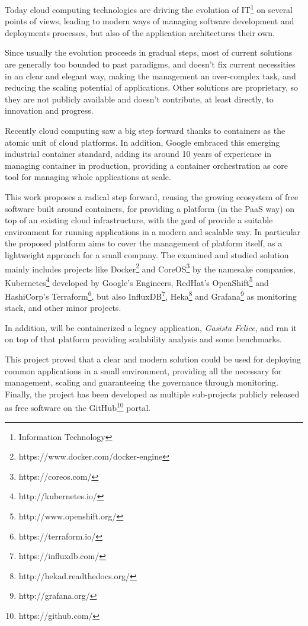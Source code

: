 Today cloud computing technologies are driving the evolution of IT\footnote{Information Technology} on several points of views, leading to modern ways of managing software development and deployments processes, but also of the application architectures their own.

Since usually the evolution proceeds in gradual steps, most of current solutions are generally too bounded to past paradigms, and doesn't fix current necessities in an clear and elegant way, making the management an over-complex task, and reducing the scaling potential of applications.  Other solutions are proprietary, so they are not publicly available and doesn't contribute, at least directly, to innovation and progress.

Recently cloud computing saw a big step forward thanks to containers as the atomic unit of cloud platforms.  In addition, Google embraced this emerging industrial container standard, adding its around 10 years of experience in managing container in production, providing a container orchestration as core tool for managing whole applications at scale.

This work proposes a radical step forward, reusing the growing ecosystem of free software built around containers, for providing a platform (in the PaaS way) on top of an existing cloud infrastructure, with the goal of provide a suitable environment for running applications in a modern and scalable way.  In particular the proposed platform aims to cover the management of platform itself, as a lightweight approach for a small company.  The examined and studied solution mainly includes projects like Docker\footnote{https://www.docker.com/docker-engine} and CoreOS\footnote{https://coreos.com/} by the namesake companies, Kubernetes\footnote{http://kubernetes.io/} developed by Google's Engineers, RedHat's OpenShift\footnote{http://www.openshift.org/} and HashiCorp's Terraform\footnote{https://terraform.io/}, but also InfluxDB\footnote{https://influxdb.com/}, Heka\footnote{http://hekad.readthedocs.org/} and Grafana\footnote{http://grafana.org/} as monitoring stack, and other minor projects.

In addition, will be  containerized a legacy application, \textit{Gasista Felice}, and ran it on top of that platform providing scalability analysis and some benchmarks.

This project proved that a clear and modern solution could be used for deploying common applications in a small environment, providing all the necessary for management, scaling and guaranteeing the governance through monitoring.  Finally, the project has been developed as multiple sub-projects publicly released as free software on the GitHub\footnote{https://github.com/} portal.

